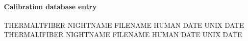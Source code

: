 \documentclass[a4paper,10pt,english]{report}
\begin{document}
\paragraph{Calibration database entry}
\label{\detokenize{user/spirou/recipes/thermal:calibration-database-entry}}
\begin{sphinxVerbatim}[commandchars=\\\{\}]
THERMALT\PYGZus{}FIBER NIGHT\PYGZus{}NAME FILENAME HUMAN DATE UNIX DATE
THERMALI\PYGZus{}FIBER NIGHT\PYGZus{}NAME FILENAME HUMAN DATE UNIX DATE
\end{sphinxVerbatim}
\end{document}
